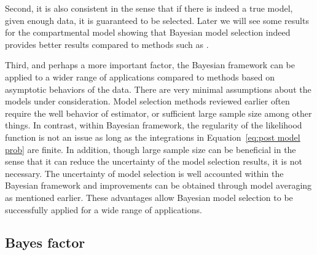 Second, it is also consistent in the sense that if there is indeed a true
model, given enough data, it is guaranteed to be selected. Later we will see
some results for the \pet compartmental model showing that Bayesian model
selection indeed provides better results compared to methods such as \aic.

Third, and perhaps a more important factor, the Bayesian framework can be
applied to a wider range of applications compared to methods based on
asymptotic behaviors of the data. There are very minimal assumptions about
the models under consideration. Model selection methods reviewed earlier
often require the well behavior of estimator, or sufficient large sample size
among other things. In contrast, within Bayesian framework, the regularity of
the likelihood function is not an issue as long as the integrations in
Equation~\eqref{eq:post model prob} are finite. In addition, though large
sample size can be beneficial in the sense that it can reduce the uncertainty
of the model selection results, it is not necessary. The uncertainty of model
selection is well accounted within the Bayesian framework and improvements
can be obtained through model averaging as mentioned earlier. These
advantages allow Bayesian model selection to be successfully applied for a
wide range of applications.

\subsection{Bayes factor}
\label{sub:Bayes factor}

